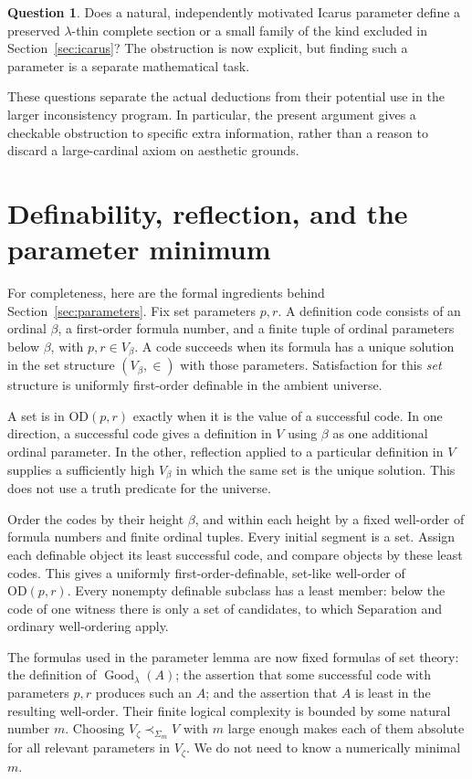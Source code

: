 \documentclass[11pt,letterpaper]{article}
\theoremstyle{definition}
\newtheorem{question}[definition]{Question}
\numberwithin{equation}{section}
\newcommand{\OD}{\mathrm{OD}}
\newcommand{\Good}{\operatorname{Good}}
\begin{document}
\begin{question}
Does a natural, independently motivated Icarus parameter define a preserved $\lambda$-thin complete section or a small family of the kind excluded in Section~\ref{sec:icarus}? The obstruction is now explicit, but finding such a parameter is a separate mathematical task.
\end{question}

These questions separate the actual deductions from their potential use in the larger inconsistency program. In particular, the present argument gives a checkable obstruction to specific extra information, rather than a reason to discard a large-cardinal axiom on aesthetic grounds.

\appendix
\section{Definability, reflection, and the parameter minimum}\label{app:OD}

For completeness, here are the formal ingredients behind Section~\ref{sec:parameters}. Fix set parameters $p,r$. A definition code consists of an ordinal $\beta$, a first-order formula number, and a finite tuple of ordinal parameters below $\beta$, with $p,r\in V_\beta$. A code succeeds when its formula has a unique solution in the set structure $(V_\beta,\in)$ with those parameters. Satisfaction for this \emph{set} structure is uniformly first-order definable in the ambient universe.

A set is in $\OD(p,r)$ exactly when it is the value of a successful code. In one direction, a successful code gives a definition in $V$ using $\beta$ as one additional ordinal parameter. In the other, reflection applied to a particular definition in $V$ supplies a sufficiently high $V_\beta$ in which the same set is the unique solution. This does not use a truth predicate for the universe.

Order the codes by their height $\beta$, and within each height by a fixed well-order of formula numbers and finite ordinal tuples. Every initial segment is a set. Assign each definable object its least successful code, and compare objects by these least codes. This gives a uniformly first-order-definable, set-like well-order of $\OD(p,r)$. Every nonempty definable subclass has a least member: below the code of one witness there is only a set of candidates, to which Separation and ordinary well-ordering apply.

The formulas used in the parameter lemma are now fixed formulas of set theory: the definition of $\Good_\lambda(A)$; the assertion that some successful code with parameters $p,r$ produces such an $A$; and the assertion that $A$ is least in the resulting well-order. Their finite logical complexity is bounded by some natural number $m$. Choosing $V_\zeta\prec_{\Sigma_m}V$ with $m$ large enough makes each of them absolute for all relevant parameters in $V_\zeta$. We do not need to know a numerically minimal $m$.
\end{document}
